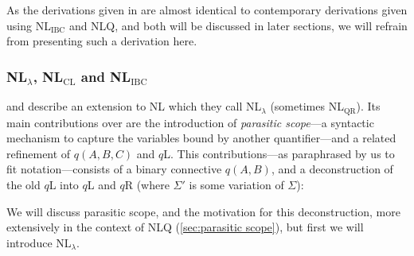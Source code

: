 As the derivations given in \citet{moortgat1996} are almost identical
to contemporary derivations given using NL$_{\text{IBC}}$ and NLQ, and
both will be discussed in later sections, we will refrain from
presenting such a derivation here.

\subsubsection{NL$_\lambda$, NL$_{\text{CL}}$ and NL$_{\text{IBC}}$}
\label{sec:nl-lambda-nl-cl-and-nl-ibc}
\citet{barker2007} and \citet{barker2015} describe an extension to NL
which they call NL$_\lambda$ (sometimes NL$_{\text{QR}}$). Its main
contributions over \citet{moortgat1996} are the introduction of
\emph{parasitic scope}---a syntactic mechanism to capture the
variables bound by another quantifier---and a related refinement of
 $q(A,B,C)$ and $q$L. This contributions---as
paraphrased by us to fit  notation---consists of
a binary connective $q(A,B)$, and a deconstruction of the old $q$L
into $q$L and $q$R (where $Σ'$ is some variation of $Σ$):
\begin{center}
  \begin{pfbox}
  \end{pfbox}
  \begin{pfbox}
  \end{pfbox}
\end{center}
We will discuss parasitic scope, and the motivation for this
deconstruction, more extensively in the context of NLQ
(\autoref{sec:parasitic scope}), but first we will introduce
NL$_\lambda$.

